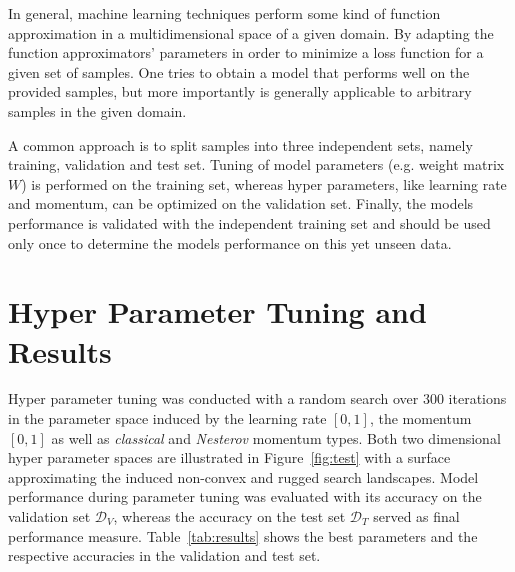 \documentclass[12pt]{article}
\begin{document}
In general, machine learning techniques perform some kind of function approximation in a multidimensional space of a given domain. By adapting the function approximators' parameters in order to minimize a loss function for a given set of samples. One tries to obtain a model that performs well on the provided samples, but more importantly is generally applicable to arbitrary samples in the given domain. 


A common approach is to split samples into three independent sets, namely training, validation and test set. Tuning of model parameters (e.g. weight matrix $W$) is performed on the training set, whereas hyper parameters, like learning rate and momentum, can be optimized on the validation set. Finally, the models performance is validated with the independent training set and should be used only once to determine the models performance on this yet unseen data. 






\section{Hyper Parameter Tuning and Results}

Hyper parameter tuning was conducted with a random search over $300$ iterations in the parameter space induced by the learning rate $[0,1]$, the momentum $[0,1]$ as well as \emph{classical} and \emph{Nesterov} momentum types. Both two dimensional hyper parameter spaces are illustrated in Figure~\ref{fig:test} with a surface approximating the induced non-convex and rugged search landscapes. Model performance during parameter tuning was evaluated with its accuracy on the validation set $\mathcal{D}_V$, whereas the accuracy on the test set $\mathcal{D}_T$ served as final performance measure. Table~\ref{tab:results} shows the best parameters and the respective accuracies in the validation and test set.
\end{document}
